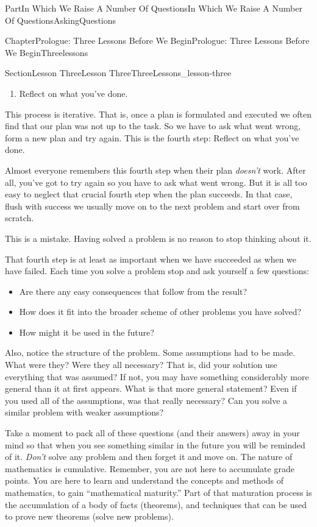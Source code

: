 \documentclass[oneside,10pt,]{book}
\numberwithin{equation}{part}
\begin{document}
\begin{partptx}{Part}{In Which We Raise A Number Of Questions}{}{In Which We Raise A Number Of Questions}{}{}{AskingQuestions}
\begin{chapterptx}{Chapter}{Prologue: Three Lessons Before We Begin}{}{Prologue: Three Lessons Before We Begin}{}{}{Threelessons}
\begin{sectionptx}{Section}{Lesson Three}{}{Lesson Three}{}{}{ThreeLessons_lesson-three}
\begin{enumerate}
\item{}Reflect on what you've done.%
\end{enumerate}
%
\par
This process is iterative.  That is, once a plan is formulated and executed we often find that our plan was not up to the task. So we have to ask what went wrong, form a new plan and try again.  This is the fourth step: Reflect on what you've done.%
\par
Almost everyone remembers this fourth step when their plan \emph{doesn't} work.  After all, you've got to try again so you have to ask what went wrong.  But it is all too easy to neglect that crucial fourth step when the plan succeeds.  In that case, flush with success we usually move on to the next problem and start over from scratch.%
\par
This is a mistake.  Having solved a problem is no reason to stop thinking about it.%
\par
That fourth step is at least as important when we have succeeded as when we have failed.  Each time you solve a problem stop and ask yourself a few questions:%
\begin{itemize}[label=\textbullet]
\item{}Are there any easy consequences that follow from the result?%
\item{}How does it fit into the broader scheme of other problems you have solved?%
\item{}How might it be used in the future?%
\end{itemize}
%
\par
Also, notice the structure of the problem.  Some assumptions had to be made.  What were they?  Were they all necessary?  That is, did your solution use everything that was assumed?  If not, you may have something considerably more general than it at first appears.  What is that more general statement?  Even if you used all of the assumptions, was that really necessary?  Can you solve a similar problem with weaker assumptions?%
\par
Take a moment to pack all of these questions (and their answers) away in your mind so that when you see something similar in the future you will be reminded of it.  \emph{Don't} solve any problem and then forget it and move on.  The nature of mathematics is cumulative.  Remember, you are not here to accumulate grade points.  You are here to learn and understand the concepts and methods of mathematics, to gain ``mathematical maturity.'' Part of that maturation process is the accumulation of a body of facts (theorems), and techniques that can be used to prove new theorems (solve new problems).%

\end{sectionptx}
\end{chapterptx}
\end{partptx}
\end{document}
